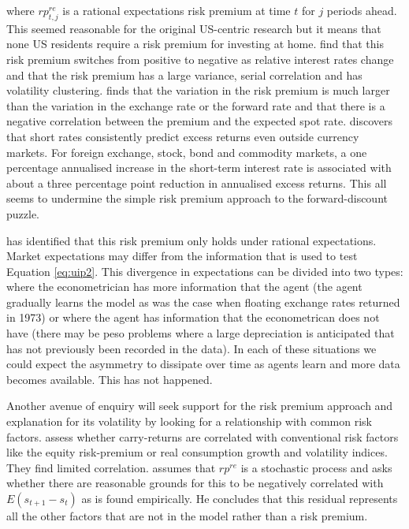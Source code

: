 \documentclass[12pt, a4paper, oneside]{article}\usepackage[]{graphicx}\usepackage[]{color}
\begin{document}
where $rp^{re}_{t, j}$ is a rational expectations risk premium at time $t$ for $j$ periods ahead.  This seemed reasonable for the original US-centric research but it means that none US residents require a risk premium for investing at home.   \citet{CanovaMarrinan} find that this risk premium switches from positive to negative as relative interest rates change and that the risk premium has a large variance, serial correlation and has volatility clustering.  \citet{FamaUIP} finds that the variation in the risk premium is much larger than the variation in the exchange rate or the forward rate and that there is a negative correlation between the premium and the expected spot rate.    \citet{FrootUIP} discovers that short rates consistently predict excess returns even outside currency markets.  For foreign exchange, stock, bond and commodity markets, a one percentage annualised increase in the short-term interest rate is associated with about a three percentage point reduction in annualised excess returns. This all seems to undermine the simple risk premium approach to the forward-discount puzzle. 

\citet{Engel1996} has identified that this risk premium only holds under rational expectations. Market expectations may differ from the information that is used to test Equation \ref{eq:uip2}. This divergence in expectations can be divided into two types: where the econometrician has more information that the agent (the agent gradually learns the model as was the case when floating exchange rates returned in 1973) or where the agent has information that the econometrican does not have (there may be peso problems where a large depreciation is anticipated that has not previously been recorded in the data).  In each of these situations we could expect the asymmetry to dissipate over time as agents learn and more data becomes available. This has not happened. 

Another avenue of enquiry will seek support for the risk premium approach and explanation for its volatility by looking for a relationship with common risk factors.  \citet{Burnside2010} assess whether carry-returns are correlated with conventional risk factors like the equity risk-premium or real consumption growth and volatility indices.  They find limited correlation. \citet{McCallum} assumes that $rp^{re}$ is a stochastic process and asks whether there are reasonable grounds for this to be negatively correlated with $E(s_{t+1}-s_t)$ as is found empirically.  He concludes that this residual represents all the other factors that are not in the model rather than a risk premium.   
\end{document}
